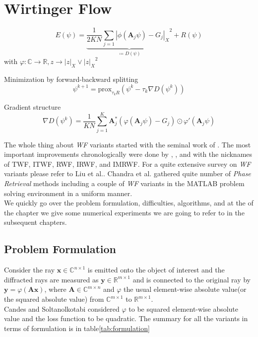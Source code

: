 \chapter{Wirtinger Flow}


\begin{equation*}
	E(\psi) = \underbrace{\frac{1}{2KN} \sum_{j=1}^{} {\left|\phi(\boldsymbol{A}_j\psi)-G_j\right|_X}^2}_{\coloneqq D(\psi)}+ R(\psi)
  \end{equation*}
  with $\varphi \colon \mathbb{C} \rightarrow \mathbb{R}, z \rightarrow \left|z\right|_X \lor {\left|z\right|_X}^2$
  
  
  Minimization by forward-backward splitting
  \begin{equation*}
	\psi^{k+1} = \text{prox}_{\tau_{k}R}(\psi^k-\tau_k\nabla{D(\psi^k)})
  \end{equation*}
  
  Gradient structure 
  \begin{equation*}
	\nabla{D(\psi^k)} = \frac{1}{KN} \sum_{j=1}^{K} \boldsymbol{A}_j^*\left(\varphi\left(\boldsymbol{A}_j\psi\right)-G_j\right)\odot \varphi'(\boldsymbol{A}_j\psi)
  \end{equation*}


The whole thing about \emph{\ac{WF}} variants started with the seminal work of \cite{Candes2014}.
The most important improvements chronologically were done by \cite{Chen2015}, \cite{Kolte2016}, and\cite{Zhang2016}
with the nicknames of \ac{TWF}, \ac{ITWF}, \ac{RWF}, \ac{IRWF}, and \ac{IMRWF}.
For a quite extensive survey on \emph{\ac{WF}} variants please refer to Liu et al.\cite{Liu2019}. Chandra et al.\cite{Chandra2017} 
gathered quite number of \emph{Phase Retrieval} methods including a couple of \emph{\ac{WF}} variants in the MATLAB\textregistered\space 
problem solving environment in a uniform manner.\\
We quickly go over the problem formulation, difficulties, algorithms, and at the of the chapter we give some numerical experiments we are going
to refer to in the subsequent chapters.

\section{Problem Formulation}
Consider the ray $\boldsymbol{x} \in \mathbb{C}^{n \times 1}$ is emitted onto the object of interest and the diffracted rays are measured as 
$\boldsymbol{y} \in \mathbb{R}^{m \times 1}$ and is connected to the original ray by $\boldsymbol{y} = \varphi(\boldsymbol{A}\boldsymbol{x})$,
where $\boldsymbol{A} \in \mathbb{C}^{m \times n}$ and $\varphi$ the usual element-wise absolute value(or the squared absolute value) from 
$\mathbb{C}^{m \times 1}$ to $\mathbb{R}^{m \times 1}$.\\
Candes and Soltanolkotabi\cite{Candes2014} considered $\varphi$ to be squared element-wise absolute value and the loss function to be quadratic. 
The summary for all the variants in terms of formulation is in table\ref{tab:formulation}  


